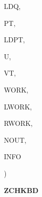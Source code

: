 {\begin{DoxyParamCaption}
\item[{integer}]{L\+D\+Q, }
\item[{{\bf complex}$\ast$16, dimension( ldpt, $\ast$ )}]{P\+T, }
\item[{integer}]{L\+D\+P\+T, }
\item[{{\bf complex}$\ast$16, dimension( ldpt, $\ast$ )}]{U, }
\item[{{\bf complex}$\ast$16, dimension( ldpt, $\ast$ )}]{V\+T, }
\item[{{\bf complex}$\ast$16, dimension( $\ast$ )}]{W\+O\+R\+K, }
\item[{integer}]{L\+W\+O\+R\+K, }
\item[{double {\bf precision}, dimension( $\ast$ )}]{R\+W\+O\+R\+K, }
\item[{integer}]{N\+O\+U\+T, }
\item[{integer}]{I\+N\+F\+O}
\end{DoxyParamCaption}
)}\label{group__complex16__eig_gae8a8aba29ee582b9b36f60338693a761}


{\bfseries Z\+C\+H\+K\+B\+D} 

